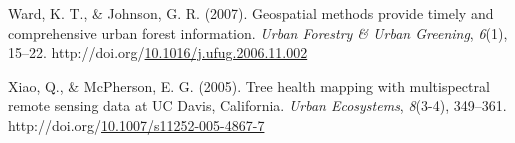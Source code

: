 \documentclass[12pt,twoside]{reedthesis}
\newlength{\cslhangindent}
\newenvironment{CSLReferences}[2] %
 {%
  \setlength{\parindent}{0pt}
  \ifodd #1 \everypar{\setlength{\hangindent}{\cslhangindent}}\ignorespaces\fi
  \ifnum #2 > 0
  \setlength{\parskip}{#2\baselineskip}
  \fi
 }%
 {}
\begin{document}
\begin{CSLReferences}{1}{0}
\leavevmode{}%
Ward, K. T., \& Johnson, G. R. (2007). Geospatial methods provide timely and comprehensive urban forest information. \emph{Urban Forestry \& Urban Greening}, \emph{6}(1), 15--22. http://doi.org/\href{https://doi.org/10.1016/j.ufug.2006.11.002}{10.1016/j.ufug.2006.11.002}

\leavevmode{}%
Xiao, Q., \& McPherson, E. G. (2005). Tree health mapping with multispectral remote sensing data at UC Davis, California. \emph{Urban Ecosystems}, \emph{8}(3-4), 349--361. http://doi.org/\href{https://doi.org/10.1007/s11252-005-4867-7}{10.1007/s11252-005-4867-7}

\end{CSLReferences}

\end{document}

